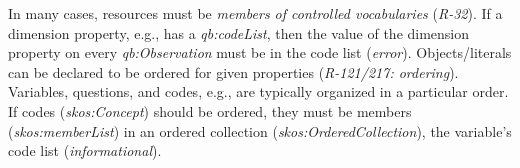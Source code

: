 \documentclass[conference]{IEEEtran}
\begin{document}
In many cases, resources must be \emph{members of controlled vocabularies} (\emph{R-32}).
If a dimension property, e.g., has a \emph{qb:codeList},
then the value of the dimension property on every \emph{qb:Observation} must be in the code list (\emph{error}).
Objects/literals can be declared to be ordered for given properties (\emph{R-121/217: ordering}).
Variables, questions, and codes, e.g., are typically organized in a particular order. 
If codes (\emph{skos:Concept}) should be ordered, they must be members (\emph{skos:memberList}) in an ordered collection (\emph{skos:OrderedCollection}), the variable's code list (\emph{informational}).
\end{document}
